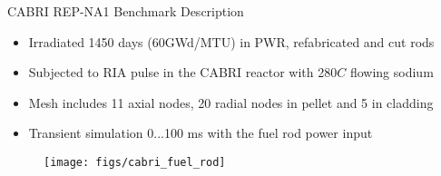 \begin{frame}{CABRI REP-NA1 Benchmark Description}

    \scriptsize

    \begin{block}{}
        \begin{itemize}
            \item Irradiated 1450 days (60GWd/MTU) in PWR, refabricated and cut rods
            \item Subjected to RIA pulse in the CABRI reactor with 280$C$ flowing sodium
            \item Mesh includes 11 axial nodes, 20 radial nodes in pellet and 5 in cladding
            \item Transient simulation 0...100 ms with the fuel rod power input
        \end{itemize}
    \end{block}


    \begin{figure}[h]
        \texttt{[image: figs/cabri\_fuel\_rod]}
    \end{figure}


\end{frame}